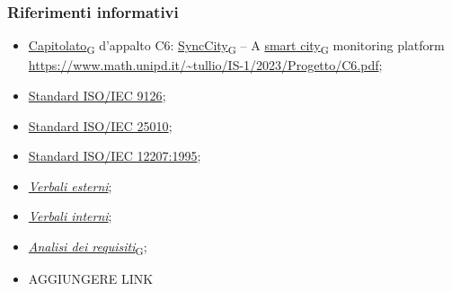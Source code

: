 \subsubsection{Riferimenti informativi}
\begin{itemize}
    \item \href{https://7last.github.io/docs/rtb/documentazione-interna/glossario#capitolato}{Capitolato\textsubscript{G}} d'appalto C6: \href{https://7last.github.io/docs/rtb/documentazione-interna/glossario#synccity}{SyncCity\textsubscript{G}} – A \href{https://7last.github.io/docs/rtb/documentazione-interna/glossario#smart-city}{smart city\textsubscript{G}} monitoring platform\\
    \url{https://www.math.unipd.it/~tullio/IS-1/2023/Progetto/C6.pdf};
    \item \href{https://it.wikipedia.org/wiki/ISO/IEC_9126}{Standard ISO/IEC 9126};
    \item \href{https://iso25000.com/index.php/en/iso-25000-standards/iso-25010}{Standard ISO/IEC 25010};
    \item \href{ https://en.wikipedia.org/wiki/ISO/IEC_12207}{Standard ISO/IEC 12207:1995};
    \item \href{URL}{\textit{Verbali esterni}};
    \item \href{URL}{\textit{Verbali interni}};
    \item \href{URL}{\href{https://7last.github.io/docs/rtb/documentazione-interna/glossario#analisi-dei-requisiti}{\textit{Analisi dei requisiti}\textsubscript{G}}};
    \item AGGIUNGERE LINK
\end{itemize}